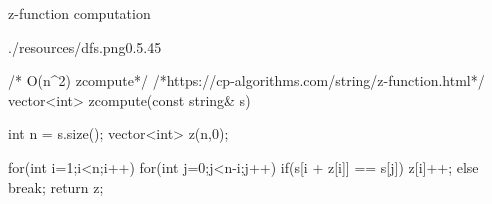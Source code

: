 \begin{problem}{z-function computation}
\end{problem}


\begin{solution}[$O(n^2)$]
    \begin{lfigure}{./resources/dfs.png}{0.5}{.45}
        \begin{code3}
/* O(n^2) zcompute*/  
/*https://cp-algorithms.com/string/z-function.html*/
vector<int> zcompute(const string& s)
{
    int n = s.size();
    vector<int> z(n,0);

    for(int i=1;i<n;i++)
    {
        for(int j=0;j<n-i;j++)
        {
            if(s[i + z[i]] == s[j])
                z[i]++;
            else
                break;
        }
    }
    return z;
}
        \end{code3}
    \end{lfigure}
\end{solution}